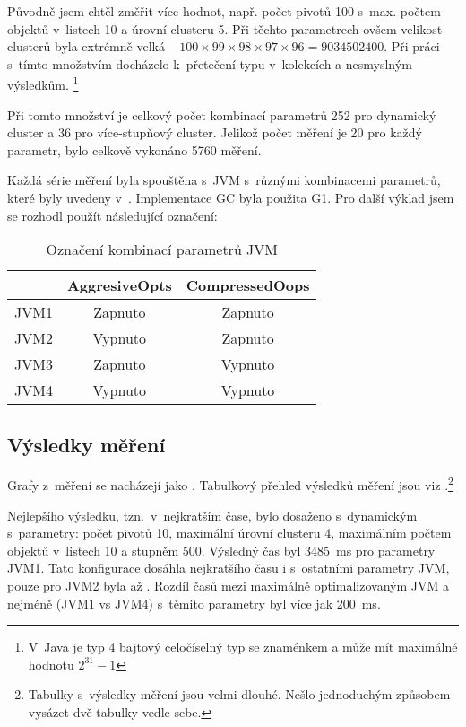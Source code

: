 Původně jsem chtěl změřit více hodnot, např. počet pivotů 100 s~max. počtem objektů v~listech 10 a úrovní clusteru 5.
Při těchto parametrech ovšem velikost clusterů byla extrémně velká -- $100 \times 99 \times 98 \times 97 \times 96 = 9034502400$.
Při práci s~tímto množstvím docházelo k~přetečení typu  v~kolekcích a nesmyslným výsledkům.
\footnote{V~Java je typ  4 bajtový celočíselný typ se znaménkem a může mít maximálně hodnotu $2^{31}-1$}

Při tomto množství je celkový počet kombinací parametrů 252 pro dynamický cluster a 36 pro více-stupňový cluster.
Jelikož počet měření je 20 pro každý parametr, bylo celkově vykonáno 5760 měření.

Každá série měření byla spouštěna s~JVM s~různými kombinacemi parametrů, které byly uvedeny v~.
Implementace GC byla použita G1.
Pro další výklad jsem se rozhodl použít následující označení:

\begin{table}[h]
\center
\begin{tabular}{|l  || c | c |}
\hline
& AggresiveOpts & CompressedOops \\ \hline
\hline
JVM1 & Zapnuto & Zapnuto \\ \hline
JVM2 & Vypnuto & Zapnuto \\ \hline
JVM3 & Zapnuto & Vypnuto \\ \hline
JVM4 & Vypnuto & Vypnuto \\ \hline
\end{tabular}
\caption{Označení kombinací parametrů JVM}
\end{table}

\subsection{Výsledky měření}
Grafy z~měření se nacházejí jako . Tabulkový přehled výsledků měření jsou viz .\footnote{Tabulky s~výsledky měření jsou velmi dlouhé. Nešlo jednoduchým způsobem vysázet dvě tabulky vedle sebe.}

Nejlepšího výsledku, tzn.~v~nejkratším čase, bylo dosaženo s~dynamickým  s~parametry: počet pivotů 10, maximální úrovní clusteru 4, maximálním počtem objektů v~listech 10 a stupněm \BPTree{} 500.
Výsledný čas byl \SI{3485}{\ms} pro parametry JVM1.
Tato konfigurace dosáhla nejkratšího času i s~ostatními parametry JVM, pouze pro JVM2 byla až .
Rozdíl časů mezi maximálně optimalizovaným JVM a nejméně (JVM1 vs JVM4) s~těmito parametry byl více jak \SI{200}{\ms}.

